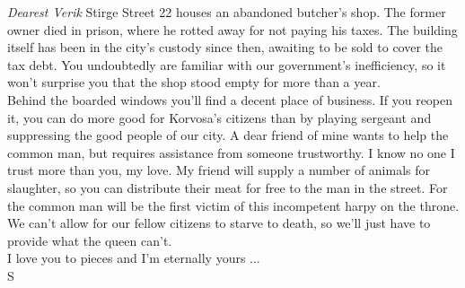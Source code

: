  {\itshape Dearest Verik}  Stirge Street 22 houses an abandoned butcher's shop. The former owner died in prison, where he rotted away for not paying his taxes. The building itself has been in the city's custody since then, awaiting to be sold to cover the tax debt. You undoubtedly are familiar with our government's inefficiency, so it won't surprise you that the shop stood empty for more than a year.\\

Behind the boarded windows you'll find a decent place of business. If you reopen it, you can do more good for Korvosa's citizens than by playing sergeant and suppressing the good people of our city. A dear friend of mine wants to help the common man, but requires assistance from someone trustworthy. I know no one I trust more than you, my love. My friend will supply a number of animals for slaughter, so you can distribute their meat for free to the man in the street. For the common man will be the first victim of this incompetent harpy on the throne. We can't allow for our fellow citizens to starve to death, so we'll just have to provide what the queen can't.\\

I love you to pieces and I'm eternally yours ...\\

S\\

